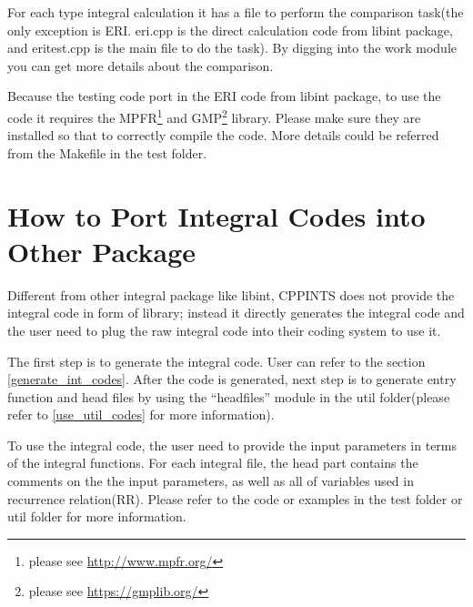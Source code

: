 For each type integral calculation it has a file to perform the comparison
task(the only exception is ERI. eri.cpp is the direct calculation code from
libint package, and eritest.cpp is the main file to do the task). By digging into
the work module you can get more details about the comparison.

Because the testing code port in the ERI code from libint package, to use the 
code it requires the MPFR\footnote{please see \url{http://www.mpfr.org/}} and 
GMP\footnote{please see \url{https://gmplib.org/}} library. Please make sure
they are installed so that to correctly compile the code. More details could
be referred from the Makefile in the test folder.

\section{How to Port Integral Codes into Other Package}
\label{port_in_raw_codes}
%
%
%
Different from other integral package like libint, CPPINTS does not provide
the integral code in form of library; instead it directly generates the 
integral code and the user need to plug the raw integral code into their
coding system to use it.

The first step is to generate the integral code. User can refer to the 
section \ref{generate_int_codes}. After the code is generated, next step
is to generate entry function and head files by using the ``headfiles''
module in the util folder(please refer to \ref{use_util_codes} for more
information).

To use the integral code, the user need to provide the input parameters
in terms of the integral functions. For each integral file, the head part
contains the comments on the the input parameters, as well as all of
variables used in recurrence relation(RR). Please refer to the code or 
examples in the test folder or util folder for more information.

